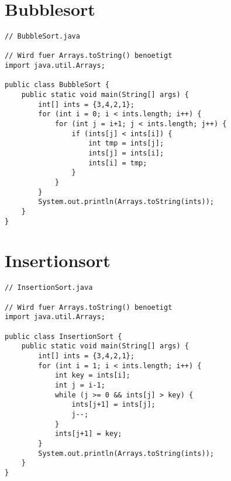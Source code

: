 \section{Bubblesort}
\begin{center}
\end{center}
\pagebreak
\begin{center}  
\begin{lstlisting}
// BubbleSort.java

// Wird fuer Arrays.toString() benoetigt
import java.util.Arrays;

public class BubbleSort {
    public static void main(String[] args) {
        int[] ints = {3,4,2,1};
        for (int i = 0; i < ints.length; i++) {
            for (int j = i+1; j < ints.length; j++) {
                if (ints[j] < ints[i]) {
                    int tmp = ints[j];
                    ints[j] = ints[i];
                    ints[i] = tmp;
                }
            }
        }
        System.out.println(Arrays.toString(ints));
    }
}
\end{lstlisting}
\end{center}

\section{Insertionsort}
\begin{center}
\begin{lstlisting}
// InsertionSort.java

// Wird fuer Arrays.toString() benoetigt
import java.util.Arrays;

public class InsertionSort {
    public static void main(String[] args) {
        int[] ints = {3,4,2,1};
        for (int i = 1; i < ints.length; i++) {
            int key = ints[i];
            int j = i-1;
            while (j >= 0 && ints[j] > key) {
                ints[j+1] = ints[j];
                j--;
            }
            ints[j+1] = key;
        }
        System.out.println(Arrays.toString(ints));
    }
}
\end{lstlisting}
\end{center}

